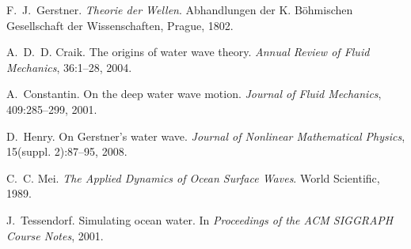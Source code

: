 \documentclass[11pt]{article}
\begin{document}
\clearpage

\begin{thebibliography}{99}

F.~J.~Gerstner. \emph{Theorie der Wellen}. Abhandlungen der K. B\"ohmischen Gesellschaft der Wissenschaften, Prague, 1802.

A.~D.~D. Craik. The origins of water wave theory. \emph{Annual Review of Fluid Mechanics}, 36:1--28, 2004.

A.~Constantin. On the deep water wave motion. \emph{Journal of Fluid Mechanics}, 409:285--299, 2001.

D.~Henry. On Gerstner’s water wave. \emph{Journal of Nonlinear Mathematical Physics}, 15(suppl. 2):87--95, 2008.

C.~C. Mei. \emph{The Applied Dynamics of Ocean Surface Waves}. World Scientific, 1989.

J.~Tessendorf. Simulating ocean water. In \emph{Proceedings of the ACM SIGGRAPH Course Notes}, 2001.

\end{thebibliography}
\end{document}
